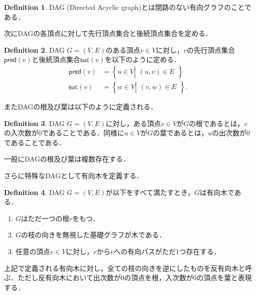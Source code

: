 \documentclass[master]{kuisthesis}		%
\theoremstyle{plain}
\theoremstyle{definition}
\newtheorem{definition*}{Definition}
\begin{document}
\begin{definition*}
    DAG (Directed Acyclic graph)とは閉路のない有向グラフのことである．
\end{definition*}

次にDAGの各頂点に対して先行頂点集合と後続頂点集合を定める．


\begin{definition*}
    DAG $G=(V, E)$のある頂点$v \in V$に対し，$v$の先行頂点集合$\mathsf{pred}(v)$と後続頂点集合$\mathsf{suc}(v)$を以下のように定める．
    \begin{align*}
        \mathsf{pred}(v) &= \left\{ u \in V \left |
        \begin{array}{l}
            \text{$(u, v) \in E$}
        \end{array}
        \right. \right\}\\
        \mathsf{suc}(v) &= \left\{ w \in V \left |
        \begin{array}{l}
            \text{$(v, w) \in E$}
        \end{array}
        \right. \right\}.
    \end{align*}
    
\end{definition*}

またDAGの根及び葉は以下のように定義される．

\begin{definition*}
    DAG $G=(V, E)$に対し，ある頂点$v\in V$が$G$の根であるとは，$v$の入次数が0であることである．同様に$u\in V$が$G$の葉であるとは，$u$の出次数が0であることである．
\end{definition*}

一般にDAGの根及び葉は複数存在する．

さらに特殊なDAGとして有向木を定義する．
\begin{definition*}
    DAG $G=(V, E)$が以下をすべて満たすとき，$G$は有向木である．
    \begin{enumerate}
        \item $G$はただ一つの根$r$をもつ．
        \item $G$の枝の向きを無視した基礎グラフが木である．
        \item 任意の頂点$v \in V$に対し，$r$から$v$への有向パスがただ1つ存在する．
    \end{enumerate}
\end{definition*}

上記で定義される有向木に対し，全ての枝の向きを逆にしたものを反有向木と呼ぶ．ただし反有向木において出次数が0の頂点を根，入次数が0の頂点を葉と表現する．
\end{document}
